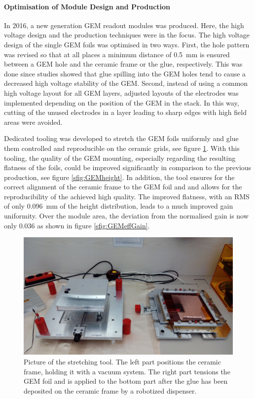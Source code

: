 \paragraph{Optimisation of Module Design and Production}

In 2016, a new generation GEM readout modules was produced. Here, the high voltage design and the production techniques were in the focus. 
The high voltage design of the single GEM foils was optimised in two ways. 
First, the hole pattern was revised so that at all places a minimum distance of \SI{0.5}{\mm} is ensured between a GEM hole and the ceramic frame or the glue, respectively.  
This was done since studies showed that glue spilling into the GEM holes tend to cause a decreased high voltage stability of the GEM. 
Second, instead of using a common high voltage layout for all GEM layers, adjusted layouts of the electrodes was implemented depending on the position of the GEM in the stack. 
In this way, cutting of the unused electrodes in a layer leading to sharp edges with high field areas were avoided.

Dedicated tooling was developed to stretch the GEM foils uniformly and glue them controlled and reproducible on the ceramic grids, see figure \ref{fig:gemstretch}. 
With this tooling, the quality of the GEM mounting, especially regarding the resulting flatness of the foils, could be improved significantly in comparison to the previous production, see figure \ref{sfig:GEMheight}.
In addition, the tool ensures for the correct alignment of the ceramic frame to the GEM foil and and allows for the reproducibility of the achieved high quality.
The improved flatness, with an RMS of only \SI{0.096}{\mm} of the height distribution, leads to a much improved gain uniformity. 
Over the module area, the deviation from the normalised gain is now only 0.036 as shown in figure \ref{sfig:GEMeffGain}.

\begin{figure}[tbhp!]
    \centering
    \includegraphics[height=0.4\textwidth]{Tracker/TPC_Bonn/plots/TPC-DG_stretching_tool.jpg}
    \caption{Picture of the stretching tool. The left part positions the ceramic frame, holding it with a vacuum system. The right part tensions the GEM foil and is applied to the bottom part after the glue has been deposited on the ceramic frame by a robotized dispenser.}
    \label{fig:gemstretch}
\end{figure}

